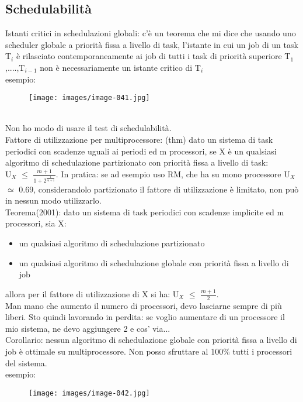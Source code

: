 \documentclass[12pt, oneside]{extbook}
\begin{document}
\subsection{Schedulabilità}
Istanti critici in schedulazioni globali: c'è un teorema che mi dice che usando uno scheduler globale a priorità fissa a livello di task, l'istante in cui un job di un task T$_{i}$ è rilasciato contemporaneamente ai job di tutti i task di priorità superiore T$_{1}$,....,T$_{i-1}$ non è necessariamente un istante critico di T$_{i}$\\ esempio:\\
\begin{figure}[!h]
\centering
\texttt{[image: images/image-041.jpg]}
\end{figure}
\\Non ho modo di usare il test di schedulabilità.\\ Fattore di utilizzazione per multiprocessore: (thm) dato un sistema di task periodici con scadenze uguali ai periodi ed m processori, se X è un qualsiasi algoritmo di schedulazione partizionato con priorità fissa a livello di task:\\
U$_{X}$ $\leq$ $\frac{m + 1}{1 + 2^{\frac{1}{m +1}}}$. In pratica: se ad esempio uso RM, che ha su mono processore U$_{X}$ $\simeq$ 0.69, considerandolo partizionato il fattore di utilizzazione è limitato, non può in nessun modo utilizzarlo.\\ Teorema(2001): dato un sistema di task periodici con scadenze implicite ed m processori, sia X:
\begin{itemize}
\item un qualsiasi algoritmo di schedulazione partizionato
\item un qualsiasi algoritmo di schedulazione globale con priorità fissa a livello di job
\end{itemize}
allora per il fattore di utilizzazione di X si ha: U$_{X}$ $\leq$ $\frac{m + 1}{2}$.\\ Man mano che aumento il numero di processori, devo lasciarne sempre di più liberi. Sto quindi lavorando in perdita: se voglio aumentare di un processore il mio sistema, ne devo aggiungere 2 e cos' via...\\ Corollario: nessun algoritmo di schedulazione globale con priorità fissa a livello di job è ottimale su multiprocessore. Non posso sfruttare al 100\% tutti i processori del sistema.\\ esempio:\\
\begin{figure}[!h]
\centering
\texttt{[image: images/image-042.jpg]}
\end{figure}
\end{document}
